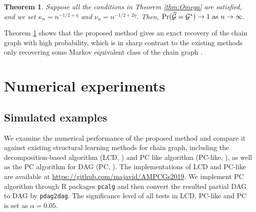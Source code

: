 \documentclass[12pt]{article}
\newtheorem{theorem}{Theorem}
\newcommand{\1}{\uppercase\expandafter{\romannumeral1}}
\newcommand{\2}{\uppercase\expandafter{\romannumeral2}}
\newcommand{\0}{\textbf{0}}
\begin{document}
\begin{theorem}\label{thm:Graph}
Suppose all the conditions in Theorem \ref{thm:Omega} are satisfied, and we set $\kappa_n = n^{-1/2+\eta}$ and $\nu_n = n^{-1/2+2\eta}$.
Then, $\Pr ( \widehat{\cal G} = {\cal G}^* ) \to 1 \ \text{as} \ n\to \infty.$
\end{theorem}

Theorem \ref{thm:Graph} shows that the proposed method gives an exact recovery of the chain graph with high probability, which is in sharp contrast to the existing methods only recovering some Markov equivalent class of the chain graph \citep{Studeny1997, Pena2014, Ma2008, Sonntag2012, Javidian2018, Pena20142, Javidian2020}.





\section{Numerical experiments}\label{sec:experiment}

\subsection{Simulated examples}

We examine the numerical performance of the proposed method and compare it against existing structural learning methods for chain graph, including the decomposition-based algorithm (LCD, \cite{Javidian2020}) and PC like algorithm (PC-like, \cite{Pena20142, Javidian2020}), as well as the PC algorithm for DAG (PC, \cite{Kalisch2007}). 
The implementations of LCD and PC-like are available at \url{https://github.com/majavid/AMPCGs2019}. We implement PC algorithm through R packages \texttt{pcalg} and then convert the resulted partial DAG to DAG by \texttt{pdag2dag}. The significance level of all tests in LCD, PC-like and PC is set as $\alpha = 0.05$.

\end{document}
